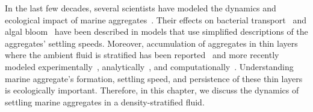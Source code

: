

In the last few decades, several scientists have modeled the dynamics and ecological impact of marine aggregates~\cite{jackson_aggregation_1998, kiorboe_mechanisms_2002}. 
Their effects on bacterial transport~\cite{jackson_simulation_1989} and algal bloom~\cite{jackson_model_1990} have been described in models that use simplified descriptions of the aggregates' settling speeds. Moreover, accumulation of aggregates in thin layers where the ambient fluid is stratified has been reported~\cite{macintyre_accumulation_1995, alldredge_occurrence_2002} and more recently modeled experimentally~\cite{prairie_delayed_2013}, analytically~\cite{camassa_retention_2013}, and computationally~\cite{panah_simulations_2017}. 
Understanding marine aggregate's formation, settling speed, and persistence of these thin layers is ecologically important. 
Therefore, in this chapter, we discuss the dynamics of settling marine aggregates in a density-stratified fluid. 
